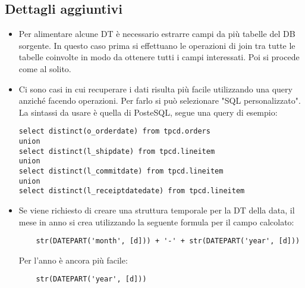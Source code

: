 \subsection{Dettagli aggiuntivi}
\begin{itemize}
	\item Per alimentare alcune DT è necessario estrarre campi da più tabelle del DB sorgente. In questo caso prima si effettuano le operazioni di join tra tutte le tabelle coinvolte in modo da ottenere tutti i campi interessati. Poi si procede come al solito.
	\item Ci sono casi in cui recuperare i dati risulta più facile utilizzando una query anziché facendo operazioni. Per farlo si può selezionare "SQL personalizzato". La sintassi da usare è quella di PosteSQL, segue una query di esempio:
	\begin{verbatim}
select distinct(o_orderdate) from tpcd.orders
union
select distinct(l_shipdate) from tpcd.lineitem
union
select distinct(l_commitdate) from tpcd.lineitem
union
select distinct(l_receiptdatedate) from tpcd.lineitem
	\end{verbatim}
	\item Se viene richiesto di creare una struttura temporale per la DT della data, il mese in anno si crea utilizzando la seguente formula per il campo calcolato:
	\begin{verbatim}
	str(DATEPART('month', [d])) + '-' + str(DATEPART('year', [d]))
	\end{verbatim}
	Per l'anno è  ancora più facile:
	\begin{verbatim}
	str(DATEPART('year', [d]))
	\end{verbatim}
\end{itemize}
